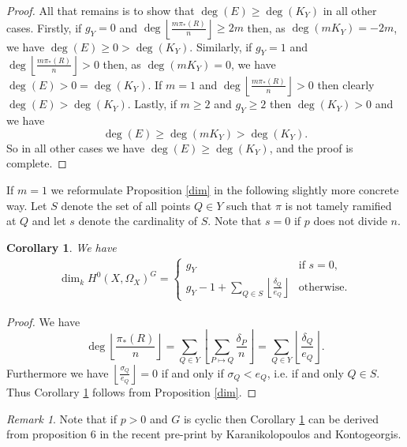 \documentclass[11pt]{article} %
\newtheorem{cor}{Corollary}
\theoremstyle{remark}\newtheorem*{rem}{Remark}
\begin{document}
\begin{proof}
  All that remains is to show that $\deg(E)\geq \deg(K_Y)$ in all other cases.
  Firstly, if $g_Y=0$ and $\deg \left\lfloor\frac{m\pi_*(R)}{n} \right\rfloor \geq 2m$ then, as $\deg(mK_Y)=-2m$, we have $\deg \left( E \right) \geq 0 > \deg(K_Y)$.
  Similarly, if $g_Y=1$ and $\deg \left\lfloor\frac{m\pi_*(R)}{n} \right\rfloor >0$ then, as $\deg \left( mK_Y \right)=0$, we have $\deg \left( E \right) > 0 = \deg (K_Y)$.
  If $m=1$ and $\deg \left\lfloor\frac{m\pi_*(R)}{n} \right\rfloor >0$ then clearly $\deg \left( E \right) > \deg (K_Y)$.
  Lastly, if $m\geq 2$ and $g_Y\geq 2$ then $\deg (K_Y) > 0$ and we have 
    \begin{equation*}
      \deg \left( E \right) \geq \deg\left( mK_Y \right) > \deg (K_Y).
    \end{equation*}
  So in all other cases we have $\deg(E)\geq \deg(K_Y)$, and the proof is complete.
  \end{proof}


If $m=1$ we reformulate Proposition \ref{dim} in the following slightly more concrete way. 
Let $S$ denote the set of all points $Q\in Y$ such that $\pi$ is not tamely ramified at $Q$ and let $s$ denote the cardinality of $S$. 
Note that $s=0$ if $p$ does not divide $n$.\\

\begin{cor}\label{dim2}
  We have 
    \begin{eqnarray*}
      \dim_kH^0(X,\Omega_X)^G = 
	\begin{cases}
	  g_Y & \mbox{if } s=0, \\
	  g_Y-1+\sum_{Q\in S}\left\lfloor \frac{\delta_Q}{e_Q} \right\rfloor & \mbox{otherwise}.
	\end{cases}
    \end{eqnarray*}
\end{cor}
\begin{proof}
  We have
    \[
	\deg\left\lfloor\frac{\pi_*(R)}{n} \right\rfloor = \sum_{Q\in Y}\left\lfloor\sum_{P\mapsto Q} \frac{\delta_P}{n} \right\rfloor = \sum_{Q\in Y} \left\lfloor \frac{\delta_Q}{e_Q} \right\rfloor.
    \]
Furthermore we have $\left\lfloor \frac{\sigma_Q}{e_Q} \right\rfloor = 0$ if and only if $\sigma_Q<e_Q$, i.e. if and only $Q\in S$. 
Thus Corollary \ref{dim2} follows from Proposition \ref{dim}.
\end{proof}

\begin{rem}
  Note that if $p>0$ and $G$ is cyclic then Corollary \ref{dim2} can be derived from proposition 6 in the recent pre-print
 \cite{kako} by Karanikolopoulos and Kontogeorgis.
\end{rem}
\end{document}
